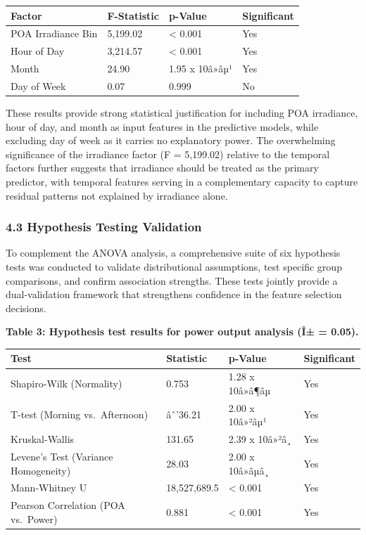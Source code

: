 \documentclass[
  11pt,
]{article}
\newcounter{none} %
\begin{document}
{\def\LTcaptype{none} %
\begin{longtable}[]{@{}llll@{}}
\toprule\noalign{}
Factor & F-Statistic & p-Value & Significant \\
\midrule\noalign{}
\endhead
\bottomrule\noalign{}
\endlastfoot
POA Irradiance Bin & 5,199.02 & \textless{} 0.001 & Yes \\
Hour of Day & 3,214.57 & \textless{} 0.001 & Yes \\
Month & 24.90 & 1.95 x 10â»âµ¹ & Yes \\
Day of Week & 0.07 & 0.999 & No \\
\end{longtable}
}

These results provide strong statistical justification for including POA
irradiance, hour of day, and month as input features in the predictive
models, while excluding day of week as it carries no explanatory power.
The overwhelming significance of the irradiance factor (F = 5,199.02)
relative to the temporal factors further suggests that irradiance should
be treated as the primary predictor, with temporal features serving in a
complementary capacity to capture residual patterns not explained by
irradiance alone.

\subsubsection{4.3 Hypothesis Testing
Validation}\label{hypothesis-testing-validation}

To complement the ANOVA analysis, a comprehensive suite of six
hypothesis tests was conducted to validate distributional assumptions,
test specific group comparisons, and confirm association strengths.
These tests jointly provide a dual-validation framework that strengthens
confidence in the feature selection decisions.

\textbf{Table 3: Hypothesis test results for power output analysis (Î± =
0.05).}

{\def\LTcaptype{none} %
\begin{longtable}[]{@{}llll@{}}
\toprule\noalign{}
Test & Statistic & p-Value & Significant \\
\midrule\noalign{}
\endhead
\bottomrule\noalign{}
\endlastfoot
Shapiro-Wilk (Normality) & 0.753 & 1.28 x 10â»â¶âµ & Yes \\
T-test (Morning vs.~Afternoon) & âˆ’36.21 & 2.00 x 10â»²âµ¹ & Yes \\
Kruskal-Wallis & 131.65 & 2.39 x 10â»²â¸ & Yes \\
Levene’s Test (Variance Homogeneity) & 28.03 & 2.00 x 10â»âµâ¸ & Yes \\
Mann-Whitney U & 18,527,689.5 & \textless{} 0.001 & Yes \\
Pearson Correlation (POA vs.~Power) & 0.881 & \textless{} 0.001 & Yes \\
\end{longtable}
}
\end{document}
